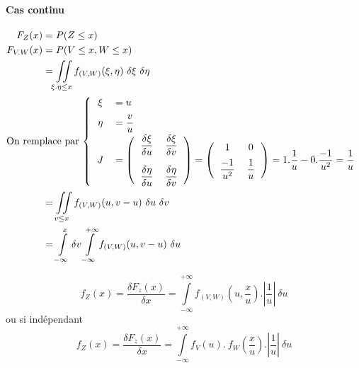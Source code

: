 \paragraph{Cas continu}
\begin{align*}
	F_Z(x)     &= P(Z \leq x)\\
	F_{V.W}(x) &= P(V \leq x, W \leq x) \\
	           &= \iint\limits_{\xi . \eta\leq x} f_{(V,W)}(\xi,\eta)\ \delta\xi\ \delta\eta\\
	\intertext{On remplace par $\left\{
		\begin{tabular}{cl}
			$\xi$  & $= u$\\[0.2cm]
			$\eta$ & $= \dfrac{v}{u}$\\[0.2cm]
			$J$    & $= \left(\begin{tabular}{cc}$\dfrac{\delta\xi}{\delta u}$&$\dfrac{\delta \xi}{\delta v}$\\[0.5cm]$\dfrac{\delta\eta}{\delta u}$&$\dfrac{\delta\eta}{\delta v}$\end{tabular}\right) = \left(\begin{tabular}{cc}1&0\\[0.2cm]$\dfrac{-1}{u^2}$&$\dfrac{1}{u}$\end{tabular}\right) = 1.\dfrac{1}{u} - 0.\dfrac{-1}{u^2} = \dfrac{1}{u}$
		\end{tabular}
		\right.$}
	&= \iint\limits_{v\leq x} f_{(V,W)}(u,v-u)\ \delta u\ \delta v\\
	&= \int\limits_{-\infty}^x\delta v \int\limits_{-\infty}^{+\infty} f_{(V,W)}(u,v-u)\ \delta u
\end{align*}

$$\boxed{f_Z(x) = \frac{\delta F_z(x)}{\delta x} = \int\limits_{-\infty}^{+\infty} f_{(V,W)}\left(u,\dfrac{x}{u}\right).\left|\dfrac{1}{u}\right|\ \delta u }$$
ou si indépendant
$$\boxed{f_Z(x) = \frac{\delta F_z(x)}{\delta x} = \int\limits_{-\infty}^{+\infty} f_V\left(u\right).\ f_W\left(\dfrac{x}{u}\right).\left|\dfrac{1}{u}\right|\ \delta u }$$